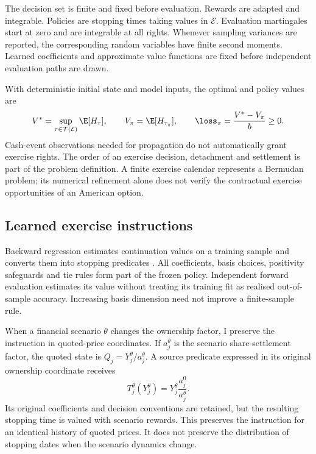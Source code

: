 \begin{assumption}[Admissibility]
The decision set is finite and fixed before evaluation. Rewards are adapted and integrable. Policies are stopping times taking values in $\mathcal E$. Evaluation martingales start at zero and are integrable at all rights. Whenever sampling variances are reported, the corresponding random variables have finite second moments. Learned coefficients and approximate value functions are fixed before independent evaluation paths are drawn.
\label{ass:admissible}
\end{assumption}

With deterministic initial state and model inputs, the optimal and policy values are
\begin{equation}
 V^*=\sup_{\tau\in\mathcal T(\mathcal E)}\E[H_\tau],
 \qquad V_\pi=\E[H_{\tau_\pi}],
 \qquad \loss_\pi=\frac{V^*-V_\pi}{b}\geq0.
\label{eq:loss}
\end{equation}
Cash-event observations needed for propagation do not automatically grant exercise rights. The order of an exercise decision, detachment and settlement is part of the problem definition. A finite exercise calendar represents a Bermudan problem; its numerical refinement alone does not verify the contractual exercise opportunities of an American option.

\subsection{Learned exercise instructions}

Backward regression estimates continuation values on a training sample and converts them into stopping predicates \citep{longstaff2001}. All coefficients, basis choices, positivity safeguards and tie rules form part of the frozen policy. Independent forward evaluation estimates its value without treating its training fit as realised out-of-sample accuracy. Increasing basis dimension need not improve a finite-sample rule.

When a financial scenario $\theta$ changes the ownership factor, I preserve the instruction in quoted-price coordinates. If $a_j^\theta$ is the scenario share-settlement factor, the quoted state is $Q_j=Y_j^\theta/a_j^\theta$. A source predicate expressed in its original ownership coordinate receives
\begin{equation}
 T_j^\theta(Y_j^\theta)
 =Y_j^\theta\frac{a_j^0}{a_j^\theta}.
\label{eq:transfer}
\end{equation}
Its original coefficients and decision conventions are retained, but the resulting stopping time is valued with scenario rewards. This preserves the instruction for an identical history of quoted prices. It does not preserve the distribution of stopping dates when the scenario dynamics change.
